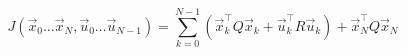 \documentclass{article}
\begin{document}
\thispagestyle{empty}

$$
J(\vec{x}_0\dots\vec{x}_N,\vec{u}_0\dots\vec{u}_{N-1}) = \sum\limits_{k=0}^{N-1}\left( \vec{x}_k^\top Q\vec{x}_k + \vec{u}_k^\top R\vec{u}_k\right) + \vec{x}_N^\top Q \vec{x}_N
$$
\end{document}
